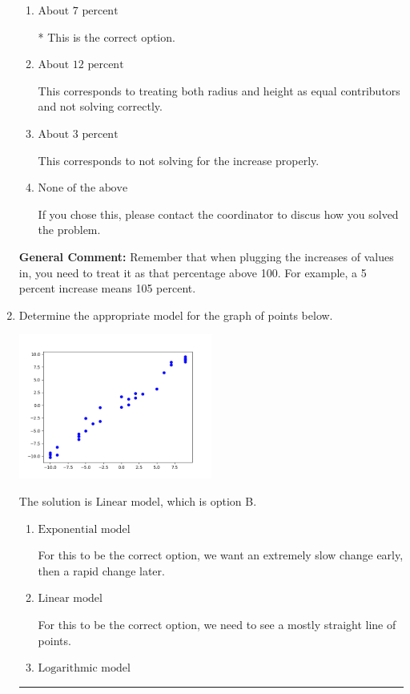 \documentclass{extbook}[14pt]
\newcommand{\litem}[1]{\item #1

\rule{\textwidth}{0.4pt}}
\begin{document}
\begin{enumerate}
{\begin{enumerate}[label=\Alph*.]
This corresponds to solving correctly but treating both radius and height as equal contributors to the volume.
\item \( \text{About } 7 \text{ percent} \)

* This is the correct option.
\item \( \text{About } 12 \text{ percent} \)

This corresponds to treating both radius and height as equal contributors and not solving correctly.
\item \( \text{About } 3 \text{ percent} \)

This corresponds to not solving for the increase properly.
\item \( \text{None of the above} \)

If you chose this, please contact the coordinator to discus how you solved the problem.
\end{enumerate}

\textbf{General Comment:} Remember that when plugging the increases of values in, you need to treat it as that percentage above 100. For example, a 5 percent increase means 105 percent.
}
\litem{
Determine the appropriate model for the graph of points below.

\begin{center}
    \includegraphics[width=0.5\textwidth]{../Figures/identifyModelGraph12CopyA.png}
\end{center}


The solution is \( \text{Linear model} \), which is option B.\begin{enumerate}[label=\Alph*.]
\item \( \text{Exponential model} \)

For this to be the correct option, we want an extremely slow change early, then a rapid change later.
\item \( \text{Linear model} \)

For this to be the correct option, we need to see a mostly straight line of points.
\item \( \text{Logarithmic model} \)


\end{enumerate}}
\end{enumerate}
\end{document}
